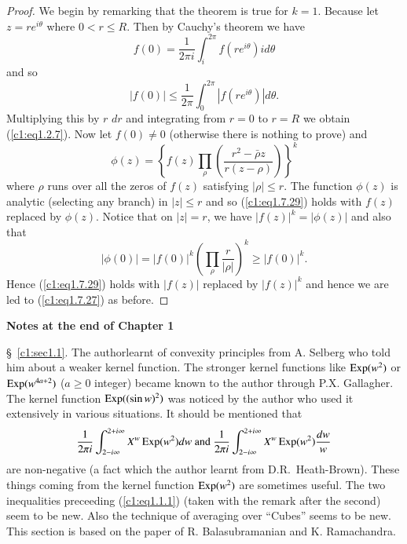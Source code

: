 \begin{proof}
We begin by remarking that the theorem is true for $k=1$. Because let $z = re^{i\theta}$ where $0 < r \leq R$. Then by Cauchy's theorem we have
\begin{equation*}
f(0) = \frac{1}{2 \pi i} \int^{2\pi}_i f(re^{i\theta}) i d \theta \tag{1.7.28}\label{c1:eq1.7.28}
\end{equation*}
and so 
\begin{equation*}
|f(0)| \leq \frac{1}{2\pi} \int^{2\pi}_0 |f(re^{i\theta})| d\theta. \tag{1.7.29}\label{c1:eq1.7.29}
\end{equation*}
Multiplying this by $r$ $dr$ and integrating from $r =0$ to $r =R$ we obtain (\ref{c1:eq1.2.7}). Now let $f(0) \neq 0$ (otherwise there is nothing to prove) and
\begin{equation*}
\phi(z) = \left\{ f(z) \prod\limits_{\rho} \left(\frac{r^2 - \bar{\rho} z}{r(z-\rho)}\right)\right\}^k \tag{1.7.30}\label{c1:eq1.7.30}
\end{equation*}
where $\rho$ runs over all the zeros of $f(z)$ satisfying $|\rho| \leq r$. The function $\phi(z)$ is analytic (selecting any branch) in $|z| \leq r$ and so (\ref{c1:eq1.7.29}) holds with $f(z)$ replaced by $\phi(z)$. Notice that on $|z| = r$, we have $|f(z)|^k = |\phi(z)|$ and also that
$$
|\phi (0)| = |f(0)|^k \left( \prod\limits_\rho \frac{r}{|\rho|}\right)^k \geq |f(0)|^k. 
$$
Hence (\ref{c1:eq1.7.29}) holds with $|f(z)|$ replaced by $|f(z)|^k$ and hence we are led  to (\ref{c1:eq1.7.27}) as before.
\end{proof}

\newpage

\begin{center}
\textbf{Notes at the end of Chapter 1}
\end{center}

\S\ \ref{c1:sec1.1}. The author\pageoriginale learnt of convexity principles from A. Selberg who told him about a weaker kernel function. The stronger kernel functions like $\operatorname{Exp} (w^2)$ or $\operatorname{Exp}(w^{4a+2})$ ($a \geq 0$ integer) became known to the author through P.X. Gallagher. The kernel function $\operatorname{Exp} ((\sin w)^2)$ was noticed by the author who used it extensively in various  situations. It should be mentioned that
$$
\frac{1}{2\pi i} \int^{2+ i \infty}_{2-i\infty} X^w \operatorname{Exp} (w^2) dw \text{ and } \frac{1}{2\pi i} \int^{2+ i \infty}_{2-i \infty} X^w \operatorname{Exp} (w^2) \frac{dw}{w}
$$
are non-negative (a fact which the author learnt from {\small D.R.~Heath-Brown}). These things coming from the kernel function $\operatorname{Exp} (w^2)$ are sometimes useful. The two inequalities preceeding (\ref{c1:eq1.1.1}) (taken with the remark after the second) seem to be new. Also the technique of averaging over ``Cubes'' seems to be new. This section is based on the paper \cite{Balasubramanian and  Ramachandra1} of R. Balasubramanian and K. Ramachandra.

